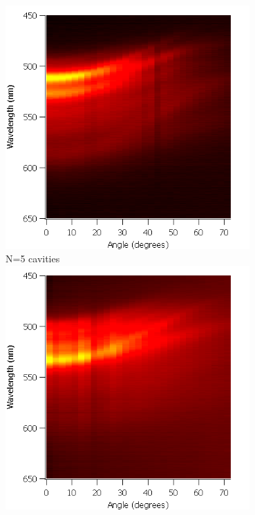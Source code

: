 \documentclass{beamer}
\begin{document}
\begin{frame}
\begin{columns}
\begin{column}{0.5\textwidth}
					\includegraphics[width=0.7\textwidth]{images/n3_heatmap.png}\\
					N=5 cavities\\
					\includegraphics[width=0.7\textwidth]{images/n5_heatmap.png}
				\end{column}
            \end{columns}
        \end{frame}
        
\end{document}
